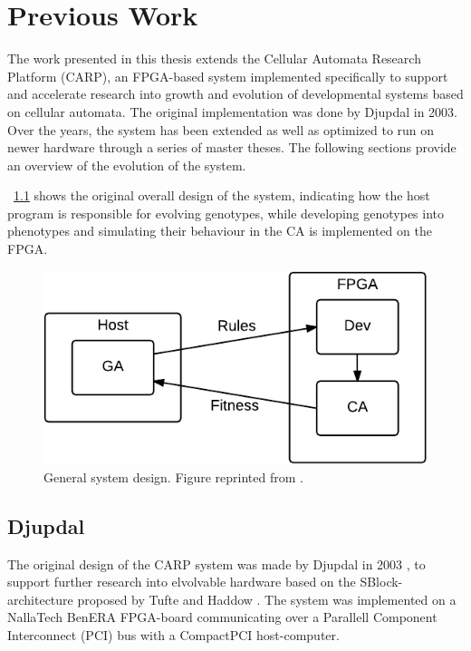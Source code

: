 
\chapter{Previous Work}

The work presented in this thesis extends the Cellular Automata Research
Platform (CARP), an FPGA-based system implemented specifically to support and
accelerate research into growth and evolution of developmental systems based on
cellular automata. The original implementation was done by Djupdal in 2003. Over
the years, the system has been extended as well as optimized to run on newer
hardware through a series of master theses. The following sections provide an
overview of the evolution of the system.

\figurename~\ref{fig:overview-general} shows the original overall design of the
system, indicating how the host program is responsible for evolving genotypes,
while developing genotypes into phenotypes and simulating their behaviour in the
CA is implemented on the FPGA.

\begin{figure}[ht]
  \centering
  \includegraphics[width=0.6\linewidth]{fig/overview-general}
  \caption[General system design]{General system design. Figure reprinted from \cite{Lundal2015a}.\label{fig:overview-general} }
\end{figure}

%

\section{Djupdal}

The original design of the CARP system was made by Djupdal in 2003
\cite{Djupdal2003}, to support further research into elvolvable hardware based
on the SBlock-architecture proposed by Tufte and Haddow \cite{Haddow2000a}. The
system was implemented on a NallaTech BenERA FPGA-board communicating over a
Parallell Component Interconnect (PCI) bus with a CompactPCI host-computer.

